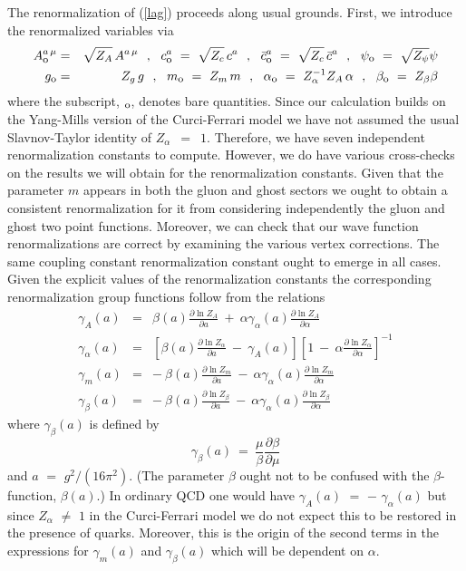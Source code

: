 \documentclass[a4paper,11pt]{article}
\begin{document}
The renormalization of (\ref{lag}) proceeds along usual grounds. First, we 
introduce the renormalized variables via 
\begin{eqnarray} 
A^{a \, \mu}_{\mbox{\footnotesize{o}}} &=& \sqrt{Z_A} \, A^{a \, \mu} ~~,~~ 
c^a_{\mbox{\footnotesize{o}}} ~=~ \sqrt{Z_c} \, c^a ~~,~~ 
\bar{c}^a_{\mbox{\footnotesize{o}}} ~=~ \sqrt{Z_c} \, \bar{c}^a ~~,~~ 
\psi_{\mbox{\footnotesize{o}}} ~=~ \sqrt{Z_\psi} \psi \nonumber \\ 
g_{\mbox{\footnotesize{o}}} &=& Z_g \, g ~~,~~ m_{\mbox{\footnotesize{o}}} ~=~ 
Z_m \, m ~~,~~ \alpha_{\mbox{\footnotesize{o}}} ~=~ Z^{-1}_\alpha Z_A \, 
\alpha ~~,~~ \beta_{\mbox{\footnotesize{o}}} ~=~ Z_\beta \beta 
\label{Zdefns}
\end{eqnarray} 
where the subscript, ${}_{\mbox{\footnotesize{o}}}$, denotes bare quantities.
Since our calculation builds on the Yang-Mills version of the Curci-Ferrari 
model we have not assumed the usual Slavnov-Taylor identity of 
$Z_\alpha$~$=$~$1$. Therefore, we have seven independent renormalization 
constants to compute. However, we do have various cross-checks on the results 
we will obtain for the renormalization constants. Given that the parameter $m$ 
appears in both the gluon and ghost sectors we ought to obtain a consistent 
renormalization for it from considering independently the gluon and ghost two 
point functions. Moreover, we can check that our wave function renormalizations
are correct by examining the various vertex corrections. The same coupling 
constant renormalization constant ought to emerge in all cases. Given the 
explicit values of the renormalization constants the corresponding 
renormalization group functions follow from the relations 
\begin{eqnarray} 
\gamma_A(a) &=& \beta(a) \frac{\partial \ln Z_A}{\partial a} ~+~
\alpha \gamma_\alpha(a) \frac{\partial \ln Z_A}{\partial \alpha} \nonumber \\
\gamma_\alpha(a) &=& \left[ \beta(a) \frac{\partial \ln Z_\alpha}{\partial a} 
{}~-~ \gamma_A(a) \right] \left[ 1 ~-~ \alpha \frac{\partial 
\ln Z_\alpha}{\partial \alpha} \right]^{-1} \nonumber \\ 
\gamma_m(a) &=& -~ \beta(a) \frac{\partial \ln Z_m}{\partial a} ~-~
\alpha \gamma_\alpha(a) \frac{\partial \ln Z_m}{\partial \alpha} \nonumber \\
\gamma_\beta(a) &=& -~ \beta(a) \frac{\partial \ln Z_\beta}{\partial a} ~-~
\alpha \gamma_\alpha(a) \frac{\partial \ln Z_\beta}{\partial \alpha} 
\label{rgedefn} 
\end{eqnarray} 
where $\gamma_\beta(a)$ is defined by
\begin{equation}
\gamma_\beta(a) ~=~ \frac{\mu}{\beta} \frac{\partial \beta}{\partial \mu} 
\end{equation} 
and $a$ $=$ $g^2/(16\pi^2)$. (The parameter $\beta$ ought not to be confused 
with the $\beta$-function, $\beta(a)$.) In ordinary QCD one would have 
$\gamma_A(a)$ $=$ $-$ $\gamma_\alpha(a)$ but since $Z_\alpha$ $\neq$ $1$ in the
Curci-Ferrari model we do not expect this to be restored in the presence of 
quarks. Moreover, this is the origin of the second terms in the expressions for
$\gamma_m(a)$ and $\gamma_\beta(a)$ which will be dependent on $\alpha$.  
\end{document}
